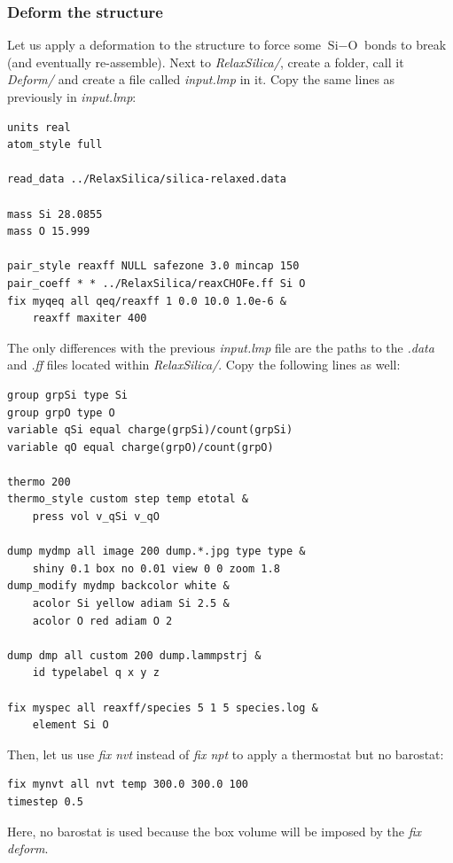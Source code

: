 \documentclass[9pt,tutorial]{livecoms}
\begin{document}
\subsubsection{Deform the structure}
Let us apply a deformation to the structure to force some $\text{Si}-\text{O}$
bonds to break (and eventually re-assemble). Next to \textit{RelaxSilica/},
create a folder, call it \textit{Deform/} and create a file called \textit{input.lmp}
in it. Copy the same lines as previously in \textit{input.lmp}:
{\normalsize \begin{verbatim}
units real
atom_style full

read_data ../RelaxSilica/silica-relaxed.data

mass Si 28.0855
mass O 15.999

pair_style reaxff NULL safezone 3.0 mincap 150
pair_coeff * * ../RelaxSilica/reaxCHOFe.ff Si O
fix myqeq all qeq/reaxff 1 0.0 10.0 1.0e-6 &
    reaxff maxiter 400
\end{verbatim}}
The only differences with the previous \textit{input.lmp} file are the paths to
the \textit{.data} and \textit{.ff} files located within \textit{RelaxSilica/}.
Copy the following lines as well:
{\normalsize \begin{verbatim}
group grpSi type Si
group grpO type O
variable qSi equal charge(grpSi)/count(grpSi)
variable qO equal charge(grpO)/count(grpO)

thermo 200
thermo_style custom step temp etotal &
    press vol v_qSi v_qO

dump mydmp all image 200 dump.*.jpg type type &
    shiny 0.1 box no 0.01 view 0 0 zoom 1.8
dump_modify mydmp backcolor white &
    acolor Si yellow adiam Si 2.5 &
    acolor O red adiam O 2

dump dmp all custom 200 dump.lammpstrj &
    id typelabel q x y z

fix myspec all reaxff/species 5 1 5 species.log &
    element Si O
\end{verbatim}}
Then, let us use \textit{fix nvt} instead of \textit{fix npt} to apply a
thermostat but no barostat:
{\normalsize \begin{verbatim}
fix mynvt all nvt temp 300.0 300.0 100
timestep 0.5
\end{verbatim}}
Here, no barostat is used because the box volume will be imposed by the \textit{fix deform}.
\end{document}
